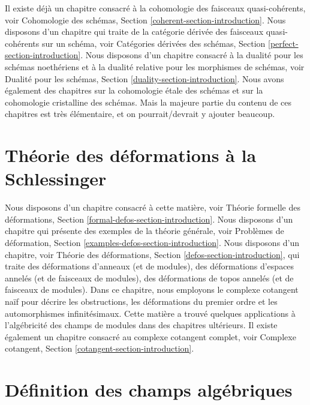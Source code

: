 \noindent
Il existe déjà un chapitre consacré à la cohomologie des faisceaux quasi-cohérents, voir
Cohomologie des schémas, Section \ref{coherent-section-introduction}.
Nous disposons d'un chapitre qui traite de la catégorie dérivée des
faisceaux quasi-cohérents sur un schéma, voir
Catégories dérivées des schémas, Section \ref{perfect-section-introduction}.
Nous disposons d'un chapitre consacré à la dualité pour les schémas noethériens
et à la dualité relative pour les morphismes de schémas, voir
Dualité pour les schémas, Section \ref{duality-section-introduction}.
Nous avons également des chapitres sur la cohomologie \'etale des schémas et sur la
cohomologie cristalline des schémas. Mais la majeure partie du contenu de ces
chapitres est très élémentaire, et on pourrait/devrait y ajouter beaucoup.


\section{Théorie des déformations \`a la Schlessinger}
\label{section-deformation-schlessinger}

\noindent
Nous disposons d'un chapitre consacré à cette matière, voir
Théorie formelle des déformations, Section \ref{formal-defos-section-introduction}.
Nous disposons d'un chapitre qui présente des exemples de la théorie générale, voir
Problèmes de déformation, Section \ref{examples-defos-section-introduction}.
Nous disposons d'un chapitre, voir
Théorie des déformations, Section \ref{defos-section-introduction},
qui traite des déformations d'anneaux (et de modules),
des déformations d'espaces annelés (et de faisceaux de modules),
des déformations de topos annelés (et de faisceaux de modules).
Dans ce chapitre, nous employons le complexe cotangent naïf
pour décrire les obstructions, les déformations du premier ordre et
les automorphismes infinitésimaux. Cette matière a trouvé quelques
applications à l'algébricité des champs de modules dans des chapitres ultérieurs.
Il existe également un chapitre consacré au complexe cotangent complet, voir
Complexe cotangent, Section \ref{cotangent-section-introduction}.


\section{Définition des champs algébriques}
\label{section-definition-algebraic-stacks}

